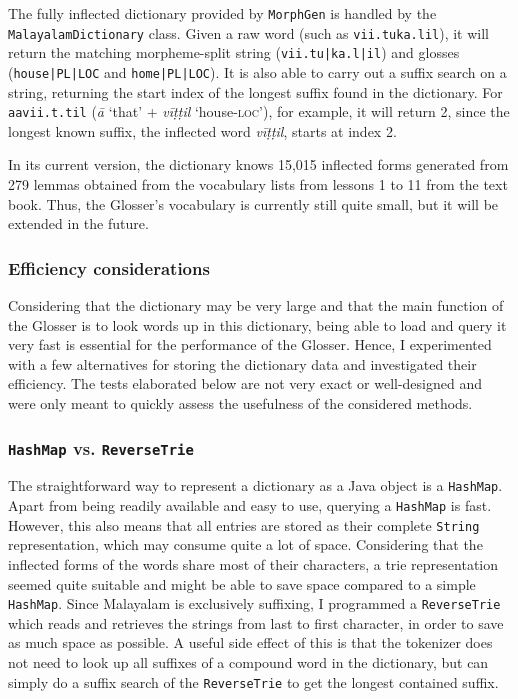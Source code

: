\documentclass[a4paper]{article}
\newcommand{\typ}[1]{\texttt{#1}}
\newcommand{\afx}[1]{\textsc{#1}}
\begin{document}
The fully inflected dictionary provided by \typ{MorphGen} is handled by the \typ{MalayalamDictionary} class. Given a raw word (such as \typ{vii.tuka.lil}), it will return the matching morpheme-split string (\typ{vii.tu|ka.l|il}) and glosses (\typ{house|PL|LOC} and \typ{home|PL|LOC}). It is also able to carry out a suffix search on a string, returning the start index of the longest suffix found in the dictionary. For \typ{aavii.t.til} (\textit{ā} `that' + \textit{vīṭṭil} `house-\afx{loc}'), for example, it will return 2, since the longest known suffix, the inflected word \textit{vīṭṭil}, starts at index 2.

In its current version, the dictionary knows 15,015 inflected forms generated from 279 lemmas obtained from the vocabulary lists from lessons 1 to 11 from the \textcite{moag} text book. Thus, the Glosser's vocabulary is currently still quite small, but it will be extended in the future.

\subsubsection{Efficiency considerations}

Considering that the dictionary may be very large and that the main function of the Glosser is to look words up in this dictionary, being able to load and query it very fast is essential for the performance of the Glosser. Hence, I experimented with a few alternatives for storing the dictionary data and investigated their efficiency. The tests elaborated below are not very exact or well-designed and were only meant to quickly assess the usefulness of the considered methods.

\subsubsection*{\typ{HashMap} vs. \typ{ReverseTrie}}

The straightforward way to represent a dictionary as a Java object is a \typ{HashMap}. Apart from being readily available and easy to use, querying a \typ{HashMap} is fast. However, this also means that all entries are stored as their complete \typ{String} representation, which may consume quite a lot of space. Considering that the inflected forms of the words share most of their characters, a trie representation seemed quite suitable and might be able to save space compared to a simple \typ{HashMap}. Since Malayalam is exclusively suffixing, I programmed a \typ{ReverseTrie} which reads and retrieves the strings from last to first character, in order to save as much space as possible. A useful side effect of this is that the tokenizer does not need to look up all suffixes of a compound word in the dictionary, but can simply do a suffix search of the \typ{ReverseTrie} to get the longest contained suffix.
\end{document}
